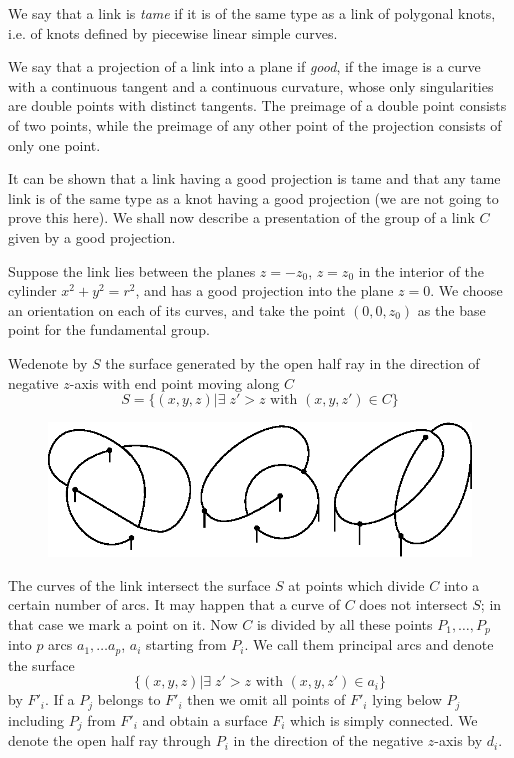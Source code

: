 We say that a link is \textit{tame} if it is of the same type as a
link of polygonal knots, i.e. of knots defined by piecewise linear
simple curves. 

We say that a projection of a link into a plane if \textit{good}, if
the image is a curve with a continuous tangent and a continuous
curvature, whose only singularities are double points with distinct
tangents. The preimage of a double point consists of two points, while
the preimage of any other point of the projection consists of only one
point. 

It can be shown that a link having a good projection is tame and that
any tame link is of the same type as a knot having a good projection
(we are not going to prove this here). We shall now describe a
presentation of the group of a link $C$ given by a good projection. 

Suppose the link lies between the planes $z = -z_0$, $z = z_0$ in the
interior of the cylinder $x^2 + y^2 = r^2$, and has a good projection
into the plane $z = 0$. We choose an orientation on each of its
curves, and take the point $(0, 0, z_0)$ as the base point for the
fundamental group. 

We\pageoriginale denote by $S$ the surface generated by the open half
ray in the direction of negative $z$-axis with end point moving along
$C$  
$$
S= \{ (x,y, z)| \exists \; z' > z \text{ with } (x, y, z') \in C\}
$$
\begin{figure}[H]
\centering
\includegraphics{vol44-fig/fig44-6-1.eps}
\end{figure}

The curves of the link intersect the surface $S$ at points which
divide $C$ into a certain number of arcs. It may happen that a curve
of $C$ does not intersect $S$; in that case we mark a point on it. Now
$C$ is divided by all these points $P_1, \ldots, P_p$ into $p$ arcs
$a_1, \ldots a_p$,  $a_i$ starting from $P_i$. We call them principal
arcs and denote the surface  
$$
 \{ (x,y, z)| \exists \; z' > z \text{ with } (x, y, z') \in a_i \}
$$
by $F'_i$. If a $P_j$ belongs to $F'_i$ then we omit all points of
$F'_i$ lying below $P_j$ including $P_j$ from $F'_i$ and obtain a
surface $F_i$ which is simply connected. We denote the open half ray
through $P_i$ in the direction of the negative $z$-axis by $d_i$. 

